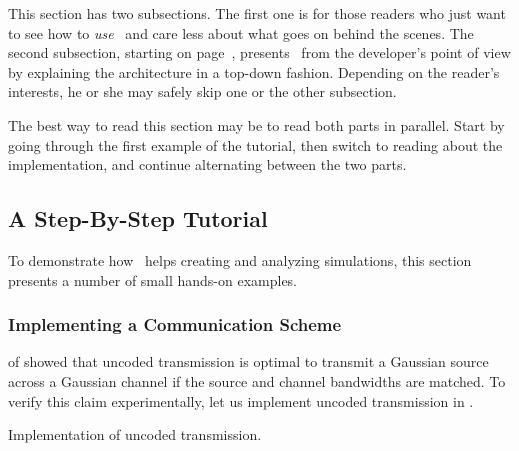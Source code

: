This section has two subsections. The first one is for those readers who just
want to see how to \emph{use} \jscsim\ and care less about what goes on behind
the scenes. The second subsection, starting on page~\pageref{sec:impoverview},
presents \jscsim\ from the developer's point of view by explaining the
architecture in a top-down fashion. Depending on the reader's interests, he or
she may safely skip one or the other subsection. 

The best way to read this section may be to read both parts in parallel. Start
by going through the first example of the tutorial, then switch to reading about
the implementation, and continue alternating between the two parts.

\subsection{A Step-By-Step Tutorial}\label{sec:tutorial}

To demonstrate how \jscsim\ helps creating and analyzing simulations, this
section presents a number of small hands-on examples. 

\subsubsection{Implementing a Communication Scheme}

 of  showed that uncoded transmission
is optimal to transmit a Gaussian source across a Gaussian channel if the source
and channel bandwidths are matched. To verify this claim experimentally, let us
implement uncoded transmission in \jscsim. 

\begin{listing}
  \caption{Implementation of uncoded transmission.}
  \label{lst:uncoded}
\end{listing}

